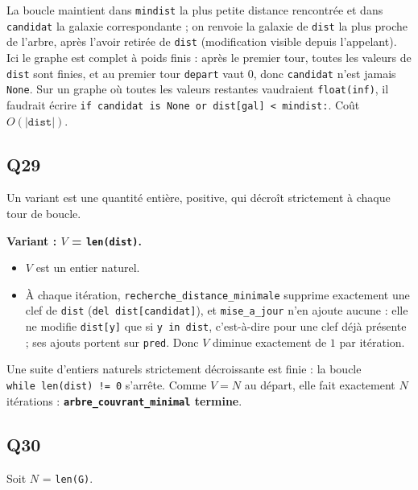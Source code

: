 \documentclass[11pt,a4paper]{article}
\providecommand{\tightlist}{\setlength{\itemsep}{0pt}\setlength{\parskip}{0pt}}
\begin{document}
La boucle maintient dans \texttt{mindist} la plus petite distance rencontrée et dans \texttt{candidat} la galaxie correspondante ; on renvoie la galaxie de \texttt{dist} la plus proche de l'arbre, après l'avoir retirée de \texttt{dist} (modification visible depuis l'appelant). Ici le graphe est complet à poids finis : après le premier tour, toutes les valeurs de \texttt{dist} sont finies, et au premier tour \texttt{depart} vaut \(0\), donc \texttt{candidat} n'est jamais \texttt{None}. Sur un graphe où toutes les valeurs restantes vaudraient \texttt{float(\textquotesingle{}inf\textquotesingle{})}, il faudrait écrire \texttt{if\ candidat\ is\ None\ or\ dist{[}gal{]}\allowbreak{}\ \textless{}\ mindist:\allowbreak{}}. Coût \(O(|\texttt{dist}|)\).

\hypertarget{q29}{%
\subsection{Q29}\label{q29}}

Un variant est une quantité entière, positive, qui décroît strictement à chaque tour de boucle.

\textbf{Variant : \(V\) = \texttt{len(dist)}.}

\begin{itemize}
\tightlist
\item
  \(V\) est un entier naturel.
\item
  À chaque itération, \texttt{recherche\_distance\_minimale} supprime exactement une clef de \texttt{dist} (\texttt{del\ dist{[}candidat{]}\allowbreak{}}), et \texttt{mise\_a\_jour} n'en ajoute aucune : elle ne modifie \texttt{dist{[}y{]}} que si \texttt{y\ in\ dist}, c'est-à-dire pour une clef déjà présente ; ses ajouts portent sur \texttt{pred}. Donc \(V\) diminue exactement de \(1\) par itération.
\end{itemize}

Une suite d'entiers naturels strictement décroissante est finie : la boucle \texttt{while\ len(\allowbreak{}dist)\allowbreak{}\ !=\allowbreak{}\ 0} s'arrête. Comme \(V = N\) au départ, elle fait exactement \(N\) itérations : \textbf{\texttt{arbre\_couvrant\_minimal} termine}.

\hypertarget{q30}{%
\subsection{Q30}\label{q30}}

Soit \(N\) = \texttt{len(G)}.
\end{document}

